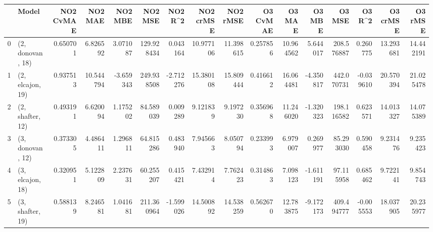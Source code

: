 \begin{tabular}{llrrrrrrrrrrrrrr}
\toprule
{} &             Model &  NO2 CvMAE &    NO2 MAE &   NO2 MBE &     NO2 MSE &   NO2 R\textasciicircum2 &  NO2 crMSE &   NO2 rMSE &  O3 CvMAE &     O3 MAE &    O3 MBE &      O3 MSE &    O3 R\textasciicircum2 &   O3 crMSE &    O3 rMSE \\
\midrule
0 &  (2, donovan, 18) &   0.650701 &   6.826592 &  3.071087 &  129.928434 &  0.043164 &  10.977106 &  11.398615 &  0.257856 &  10.964562 &  5.644017 &  208.576887 &  0.260775 &  13.293681 &  14.442191 \\
1 &  (2, elcajon, 19) &   0.937513 &  10.544794 & -3.659343 &  249.938508 & -2.712276 &  15.380108 &  15.809444 &  0.416612 &  16.064481 & -4.350817 &  442.070731 & -0.039610 &  20.570394 &  21.025478 \\
2 &  (2, shafter, 12) &   0.493191 &   6.620094 &  1.175202 &   84.589039 &  0.009289 &   9.121839 &   9.197230 &  0.356968 &  11.246020 & -1.320323 &  198.116582 &  0.623571 &  14.013327 &  14.075389 \\
3 &  (3, donovan, 12) &   0.373305 &   4.486411 &  1.296811 &   64.815286 &  0.483940 &   7.945663 &   8.050794 &  0.233993 &   6.979007 &  0.269977 &   85.293030 &  0.590458 &   9.231476 &   9.235423 \\
4 &  (3, elcajon, 18) &   0.320951 &   5.122809 &  2.237631 &   60.255207 &  0.415421 &   7.432914 &   7.762423 &  0.314863 &   7.098123 & -1.611191 &   97.115958 &  0.685462 &   9.722141 &   9.854743 \\
5 &  (3, shafter, 19) &   0.588139 &   8.246581 &  1.041681 &  211.360964 & -1.599026 &  14.500892 &  14.538259 &  0.562670 &  12.783875 & -9.172173 &  409.494777 & -0.005553 &  18.037905 &  20.235977 \\
\bottomrule
\end{tabular}
